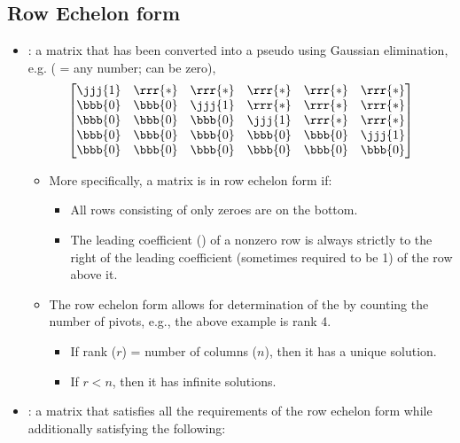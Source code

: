 \begin{itemize}
  \subsection{Row Echelon form}\label{Row Echelon form}
  \begin{itemize}
    \item {}: a matrix that has been converted into a pseudo \hyperref[Diagonal and Triagnular Matrices]{} using Gaussian elimination, e.g. (\rrr{*} = any number; can be zero),
    \[%
    \begin{bmatrix}
      \jjj{1} & \rrr{*} & \rrr{*} & \rrr{*} & \rrr{*} & \rrr{*} \\
      \bbb{0} & \bbb{0} & \jjj{1} & \rrr{*} & \rrr{*} & \rrr{*} \\
      \bbb{0} & \bbb{0} & \bbb{0} & \jjj{1} & \rrr{*} & \rrr{*} \\
      \bbb{0} & \bbb{0} & \bbb{0} & \bbb{0} & \bbb{0} & \jjj{1} \\
      \bbb{0} & \bbb{0} & \bbb{0} & \bbb{0} & \bbb{0} & \bbb{0} \\
    \end{bmatrix}
    \]%
    \begin{itemize}
      \item More specifically, a matrix is in row echelon form if:
      \begin{itemize}
        \item All rows consisting of only zeroes are on the bottom.
        \item The leading coefficient () of a nonzero row is always strictly to the right of the leading coefficient (sometimes required to be 1) of the row above it. 
      \end{itemize}
      \item The row echelon form allows for determination of the \hyperref[Matrix Rank]{} by counting the number of pivots, e.g., the above example is rank 4.
        \begin{itemize}
          \item If rank (\(r\)) =  number of columns (\(n\)), then it has a unique solution. 
          \item If \(r < n\), then it has infinite solutions.
        \end{itemize}
    \end{itemize}
    \item {} : a matrix that satisfies all the requirements of the row echelon form while additionally satisfying the following:

\end{itemize}
\end{itemize}
